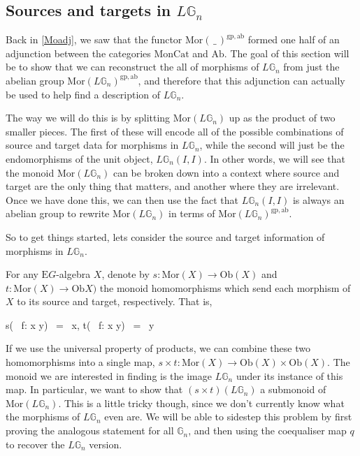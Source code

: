 \subsection{Sources and targets in $L\mathbb{G}_n$}

Back in \cref{Moadj}, we saw that the functor $\mathrm{Mor}( \, \_ \, )^{\mathrm{gp, ab}}$ formed one half of an adjunction between the categories $\mathrm{MonCat}$ and $\mathrm{Ab}$. The goal of this section will be to show that we can reconstruct the all of morphisms of $L\mathbb{G}_n$ from just the abelian group $\mathrm{Mor}(L\mathbb{G}_n)^{\mathrm{gp, ab}}$, and therefore that this adjunction can actually be used to help find a description of $L\mathbb{G}_n$.

The way we will do this is by splitting $\mathrm{Mor}(L\mathbb{G}_n)$ up as the product of two smaller pieces. The first of these will encode all of the possible combinations of source and target data for morphisms in $L\mathbb{G}_n$, while the second will just be the endomorphisms of the unit object, $L\mathbb{G}_n(I, I)$. In other words, we will see that the monoid $\mathrm{Mor}(L\mathbb{G}_n)$ can be broken down into a context where source and target are the only thing that matters, and another where they are irrelevant. Once we have done this, we can then use the fact that $L\mathbb{G}_n(I, I)$ is always an abelian group to rewrite $\mathrm{Mor}(L\mathbb{G}_n)$ in terms of $\mathrm{Mor}(L\mathbb{G}_n)^{\mathrm{gp, ab}}$.

So to get things started, lets consider the source and target information of morphisms in $L\mathbb{G}_n$.

\begin{defn} For any $\mathrm{E}G$-algebra $X$, denote by $s: \mathrm{Mor}(X) \to \mathrm{Ob}(X)$ and $t: \mathrm{Mor}(X) \to \mathrm{Ob}X)$ the monoid homomorphisms which send each morphism of $X$ to its source and target, respectively. That is,
\begin{eq*} s( \, f: x \to y) \, = \, x, \quad \quad t( \, f: x \to y) \, = \, y \end{eq*}
\end{defn}

If we use the universal property of products, we can combine these two homomorphisms into a single map, $s \times t: \mathrm{Mor}(X) \to \mathrm{Ob}(X) \times \mathrm{Ob}(X)$. The monoid we are interested in finding is the image $L\mathbb{G}_n$ under its instance of this map. In particular, we want to show that $(s \times t)(L\mathbb{G}_n)$ a submonoid of $\mathrm{Mor}(L\mathbb{G}_n)$. This is a little tricky though, since we don't currently know what the morphisms of $L\mathbb{G}_n$ even are. We will be able to sidestep this problem by first proving the analogous statement for all $\mathbb{G}_n$, and then using the coequaliser map $q$ to recover the $L\mathbb{G}_n$ version. 

